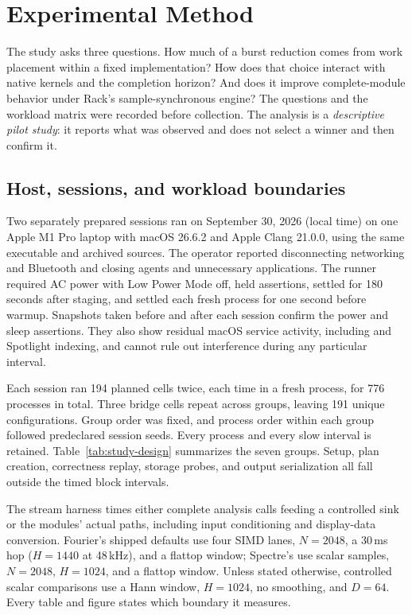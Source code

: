 \section{Experimental Method}
\label{sec:evaluation}
The study asks three questions. How much of a burst reduction comes from work
placement within a fixed implementation? How does that choice interact with
native kernels and the completion horizon? And does it improve
complete-module behavior under Rack's sample-synchronous engine? The questions
and the workload matrix were recorded before collection. The analysis is a
\emph{descriptive pilot study}: it reports what was observed and does not
select a winner and then confirm it.

\subsection{Host, sessions, and workload boundaries}
Two separately prepared sessions ran on September 30, 2026 (local time) on one
Apple M1 Pro laptop with macOS 26.6.2 and Apple Clang 21.0.0, using the same
executable and archived sources. The operator reported disconnecting
networking and Bluetooth and closing agents and unnecessary applications. The
runner required AC power with Low Power Mode off, held 
assertions, settled for 180 seconds after staging, and settled each fresh
process for one second before warmup. Snapshots taken before and after each
session confirm the power and sleep assertions. They also show residual macOS
service activity, including  and Spotlight indexing, and cannot
rule out interference during any particular interval.

Each session ran 194 planned cells twice, each time in a fresh process, for
776 processes in total. Three bridge cells repeat across groups, leaving 191
unique configurations. Group order was fixed, and process order within each
group followed predeclared session seeds. Every process and every slow
interval is retained. Table~\ref{tab:study-design} summarizes the seven
groups. Setup, plan creation, correctness replay, storage probes, and output
serialization all fall outside the timed block intervals.



The stream harness times either complete analysis calls feeding a controlled
sink or the modules' actual  paths, including input
conditioning and display-data conversion. Fourier's shipped defaults use four
SIMD lanes, $N=2048$, a 30\,ms hop ($H=1440$ at 48\,kHz), and a flattop
window; Spectre's use scalar samples, $N=2048$, $H=1024$, and a flattop
window. Unless stated otherwise, controlled scalar comparisons use a Hann
window, $H=1024$, no smoothing, and $D=64$. Every table and figure states
which boundary it measures.

